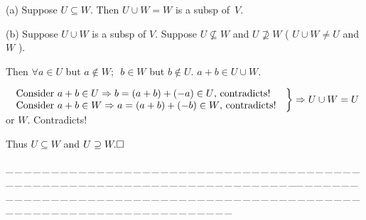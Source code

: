 \documentclass[a4paper, 11pt, UTF8]{article}
\def\Hb{\quad\hspace{8.7pt}}
\def\ProblemEnding{{\tiny \_\,\_\,\_\,\_\,\_\,\_\,\_\,\_\,\_\,\_\,\_\,\_\,\_\,\_\,\_\,\_\,\_\,\_\,\_\,\_\,\_\,\_\,\_\,\_\,\_\,\_\,\_\,\_\,\_\,\_\,\_\,\_\,\_\,\_\,\_\,\_\,\_\,\_\,\_\,\_\,\_\,\_\,\_\,\_\,\_\,\_\,\_\,\_\,\_\,\_\,\_\,\_\,\_\,\_\,\_\,\_\,\_\,\_\,\_\,\_\,\_\,\_\,\_\,\_\,\_\,\_\,\_\,\_\,\_\,\_\,\_\_\,\_\,\_\,\_\,\_\,\_\,\_\,\_\,\_\,\_\,\_\,\_\,\_\,\_\,\_\,\_\,\_\,\_\,\_\,\_\,\_\,\_\,\_\,\_\,\_\,\_\,\_\,\_\,\_\,\_\,\_\,\_\,\_\,\_\,\_\,\_\,\_\,\_\,\_\,\_\,\_\,\_\,\_\,\_\,\_\,\_\,\_\,\_\,\_\,\_\,\_\,\_\,\_\,\_\,\_\,\_\,\_\,\_\,\_\,\_\,\_\,\_\,\_\,\_\,\_\,\_\,\_\,\_\,\_\,\_\,\_}}
\begin{document}
\begin{large}
\par\quad
(a) Suppose $U\subseteq W$. Then $U\cup W=W$ is a subsp of \,$V$.\par\quad
(b) Suppose $U\cup W$ is a subsp of $V$. Suppose $U\not\subseteq W$ and $U\not\supseteq W$ ( $U\cup W\neq U$ and $W$ ).\par\quad\Hb
Then $\forall a\in U$ but $a\not\in W;\,\,\,b\in W$ but $b\not\in U.\,\,a+b\in U\cup W$.\par\vspace{6pt}\qquad
$\MathRightBrace{l}{$
Consider $a+b\in U\Rightarrow b=(a+b)+(-a)\in U$, contradicts!$\\ $
Consider $a+b\in W\Rightarrow a=(a+b)+(-b)\in W$, contradicts!
$}\Rightarrow U\cup W=U$ or $W.$ Contradicts!\par\vspace{6pt}\quad\Hb
Thus $U\subseteq W$ and $U\supseteq W.\hfill\square$\par
\ProblemEnding\par


\end{large}
\end{document}

